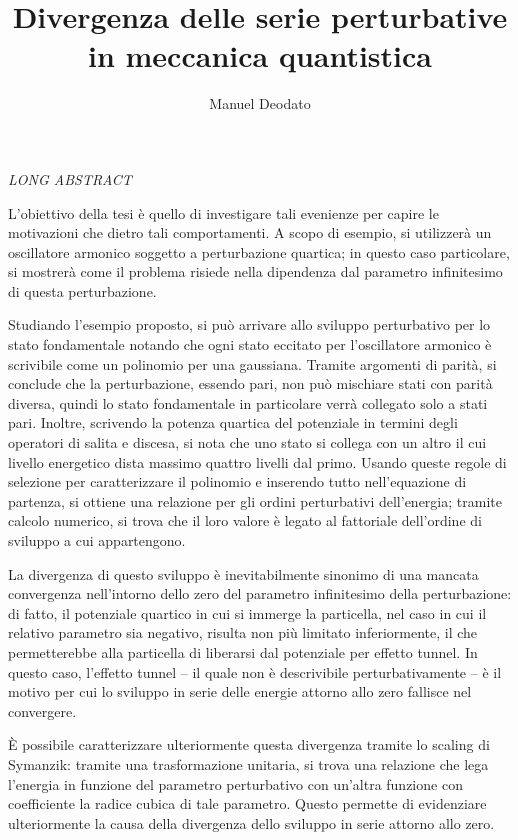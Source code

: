 \documentclass[11pt, a4paper]{scrartcl}
\title{
Divergenza delle serie
perturbative in
meccanica quantistica\\}
\author{Manuel Deodato}
\date{}
\renewcommand{\maketitle}{
\begin{center}
{\sffamily
{\fontsize{20}{20}\selectfont\MakeUppercase\thetitle}}

\vspace{0.2in}

{\large\scshape\sffamily\theauthor}
\end{center}
}
\numberwithin{equation}{subsection}
\theoremstyle{style1}
\begin{document}
\maketitle
\vspace{.5cm}
\begin{center}
	\Large\textit{LONG ABSTRACT} 
\end{center}
L'obiettivo della tesi \`e quello di investigare tali evenienze per capire le motivazioni che dietro tali comportamenti.
A scopo di esempio, si utilizzer\`a un oscillatore armonico soggetto a perturbazione quartica; in questo caso particolare, si mostrer\`a come il problema risiede nella dipendenza dal parametro infinitesimo di questa perturbazione.

Studiando l'esempio proposto, si pu\`o arrivare allo sviluppo perturbativo per lo stato fondamentale notando che ogni stato eccitato per l'oscillatore armonico \`e scrivibile come un polinomio per una gaussiana. 
Tramite argomenti di parit\`a, si conclude che la perturbazione, essendo pari, non pu\`o mischiare stati con parit\`a diversa, quindi lo stato fondamentale in particolare verr\`a collegato solo a stati pari.
Inoltre, scrivendo la potenza quartica del potenziale in termini degli operatori di salita e discesa, si nota che uno stato si collega con un altro il cui livello energetico dista massimo quattro livelli dal primo.
Usando queste regole di selezione per caratterizzare il polinomio e inserendo tutto nell'equazione di partenza, si ottiene una relazione per gli ordini perturbativi dell'energia; tramite calcolo numerico, si trova che il loro valore \`e legato al fattoriale dell'ordine di sviluppo a cui appartengono.

La divergenza di questo sviluppo \`e inevitabilmente sinonimo di una mancata convergenza nell'intorno dello zero del parametro infinitesimo della perturbazione: di fatto, il potenziale quartico in cui si immerge la particella, nel caso in cui il relativo parametro sia negativo, risulta non pi\`u limitato inferiormente, il che permetterebbe alla particella di liberarsi dal potenziale per effetto tunnel.
In questo caso, l'effetto tunnel -- il quale non \`e descrivibile perturbativamente -- \`e il motivo per cui lo sviluppo in serie delle energie attorno allo zero fallisce nel convergere.

\`E possibile caratterizzare ulteriormente questa divergenza tramite lo scaling di Symanzik: tramite una trasformazione unitaria, si trova una relazione che lega l'energia in funzione del parametro perturbativo con un'altra funzione con coefficiente la radice cubica di tale parametro. 
Questo permette di evidenziare ulteriormente la causa della divergenza dello sviluppo in serie attorno allo zero.
\end{document}
